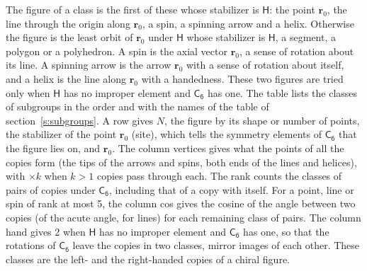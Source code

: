 \documentclass[10pt,a4paper]{article}
\numberwithin{equation}{section}
\newcommand{\grp}[1]{\mathsf{#1}}
\newcommand{\pointr}{\mathbf{r}}
\begin{document}
\leavevmode\label{n:head.figure}The figure of a class is the first of these whose stabilizer is $\grp{H}$: the point $\pointr_0$, the line through the origin along $\pointr_0$, a spin, a spinning arrow and a helix. Otherwise the figure is the least orbit of $\pointr_0$ under $\grp{H}$ whose stabilizer is $\grp{H}$, a segment, a polygon or a polyhedron. A spin is the axial vector $\pointr_0$, a sense of rotation about its line. A spinning arrow is the arrow $\pointr_0$ with a sense of rotation about itself, and a helix is the line along $\pointr_0$ with a handedness. These two figures are tried only when $\grp{H}$ has no improper element and $\grp{C_{6}}$ has one. The table lists the classes of subgroups in the order and with the names of the table of section~\ref{s:subgroups}. \label{n:head.site}A row gives $N$, the figure by its shape or number of points, the stabilizer of the point $\pointr_0$ (site), which tells the symmetry elements of $\grp{C_{6}}$ that the figure lies on, and $\pointr_0$. \label{n:head.vertices}The column vertices gives what the points of all the copies form (the tips of the arrows and spins, both ends of the lines and helices), with ${\times}k$ when $k > 1$ copies pass through each. \label{n:head.rank}The rank counts the classes of pairs of copies under $\grp{C_{6}}$, including that of a copy with itself. \label{n:head.cos}For a point, line or spin of rank at most 5, the column cos gives the cosine of the angle between two copies (of the acute angle, for lines) for each remaining class of pairs. \label{n:head.hand}The column hand gives 2 when $\grp{H}$ has no improper element and $\grp{C_{6}}$ has one, so that the rotations of $\grp{C_{6}}$ leave the copies in two classes, mirror images of each other. These classes are the left- and the right-handed copies of a chiral figure.
\end{document}
